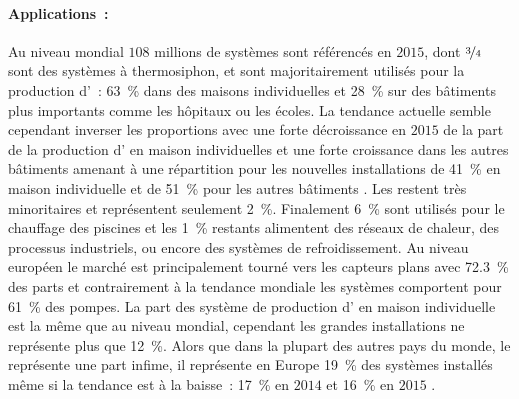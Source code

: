 \paragraph{Applications~:} %
\label{par:applications}
Au niveau mondial $108$ millions de systèmes sont référencés en $2015$, dont $\nicefrac{3}{4}$
sont des systèmes à thermosiphon, et sont majoritairement utilisés pour la production
d’~: \SI{63}{\percent} dans des maisons individuelles et \SI{28}{\percent} sur des bâtiments plus importants comme
les hôpitaux ou les écoles. La tendance actuelle semble cependant inverser les proportions
avec une forte décroissance en $2015$ de la part de la production d’ en maison individuelles
et une forte croissance dans les autres bâtiments amenant à une répartition pour les nouvelles installations
de \SI{41}{\percent} en maison individuelle et de \SI{51}{\percent} pour les autres bâtiments .
Les  restent très minoritaires et représentent seulement \SI{2}{\percent}.
Finalement \SI{6}{\percent} sont utilisés pour le chauffage des piscines et les \SI{1}{\percent}
restants alimentent des réseaux de chaleur, des processus industriels, ou encore des systèmes de
refroidissement.
Au niveau européen le marché est principalement tourné vers les capteurs plans avec \SI{72.3}{\percent}
des parts et contrairement à la tendance mondiale les systèmes comportent pour \SI{61}{\percent} des pompes.
La part des système de production d’ en maison individuelle est la même que au niveau mondial,
cependant les grandes installations ne représente plus que \SI{12}{\percent}. Alors que
dans la plupart des autres pays du monde, le  représente une part infime, il
représente en Europe \SI{19}{\percent} des systèmes installés même si la tendance est à
la baisse~: \SI{17}{\percent} en $2014$ \parencite{Mauthner2016} et \SI{16}{\percent} en
$2015$ \parencite{Weiss2017}.




